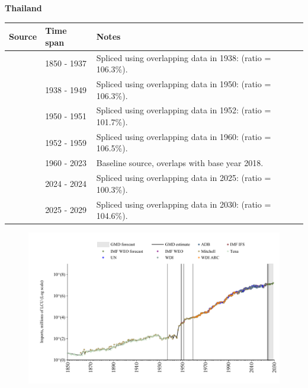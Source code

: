 \documentclass[12pt,a4paper,landscape]{article}
\begin{document}
\begin{adjustbox}{max totalsize={\paperwidth}{\paperheight},center}
\begin{minipage}[t][\textheight][t]{\textwidth}
\vspace*{0.5cm}
{}
\begin{center}
{\Large\bfseries Thailand}
\end{center}
\vspace{0.5cm}
\begin{table}[H]
\centering
\small
\begin{tabular}{|l|l|l|}
\hline
\textbf{Source} & \textbf{Time span} & \textbf{Notes} \\
\hline
\rowcolor{white}\cite{Tena}& 1850 - 1937 &Spliced using overlapping data in 1938: (ratio = 106.3\%).\\
\rowcolor{lightgray}\cite{Mitchell}& 1938 - 1949 &Spliced using overlapping data in 1950: (ratio = 106.3\%).\\
\rowcolor{white}\cite{IMF_IFS}& 1950 - 1951 &Spliced using overlapping data in 1952: (ratio = 101.7\%).\\
\rowcolor{lightgray}\cite{Mitchell}& 1952 - 1959 &Spliced using overlapping data in 1960: (ratio = 106.5\%).\\
\rowcolor{white}\cite{WDI}& 1960 - 2023 &Baseline source, overlaps with base year 2018.\\
\rowcolor{lightgray}\cite{IMF_IFS}& 2024 - 2024 &Spliced using overlapping data in 2025: (ratio = 100.3\%).\\
\rowcolor{white}\cite{IMF_WEO_forecast}& 2025 - 2029 &Spliced using overlapping data in 2030: (ratio = 104.6\%).\\
\hline
\end{tabular}
\end{table}
\begin{figure}[H]
\centering
\includegraphics[width=\textwidth,height=0.6\textheight,keepaspectratio]{graphs/THA_imports.pdf}
\end{figure}
\end{minipage}
\end{adjustbox}
\end{document}
